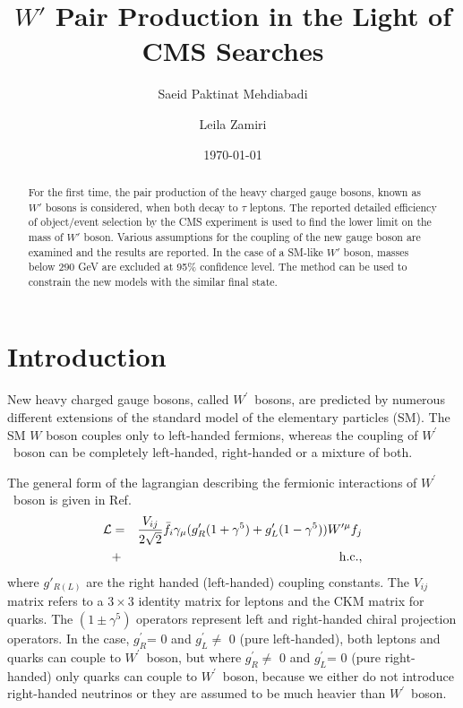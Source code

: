 \documentclass[preprint,showpacs,preprintnumbers]{revtex4}
\newcommand{\wprime}{\ensuremath{W^\prime}~}
\newcommand{\gR}{\ensuremath{g^\prime_R}}
\newcommand{\gL}{\ensuremath{g^\prime_L}}
\begin{document}
\title{$W'$ Pair Production in the Light of CMS Searches}



\author{Saeid Paktinat Mehdiabadi}

\author{Leila Zamiri}

\date{\today}

\begin{abstract}
For the first time, the pair production of the heavy charged gauge bosons, known as $W'$ bosons is considered, when both decay to $\tau$ leptons. The reported detailed efficiency of object/event selection by the CMS experiment is used to find the lower limit on the mass of $W'$ boson. Various assumptions for the coupling of the new gauge boson are examined and the results are reported. In the case of a SM-like $W'$ boson, masses below 290 GeV are excluded at 95\% confidence level. The method can be used to constrain the new models with the similar final state.
\end{abstract}

\maketitle

\section{Introduction}\label{sec:int} 
New heavy charged gauge bosons, called \wprime bosons, are predicted by numerous different extensions of the standard model of the elementary particles (SM). 
The SM $W$ boson couples only to left-handed fermions, whereas the coupling of \wprime boson can be completely left-handed, right-handed or a mixture of both. 

The general form of the lagrangian describing the fermionic interactions of \wprime boson is given in  Ref.~\cite{Sullivan:2002jt}
\begin{eqnarray}
{\cal L}& =& \frac{V_{ij}}{2\sqrt{2}}\bar{f_i} \gamma_{\mu}(g^\prime_{R} (1+{\gamma}^5)+
g^\prime_{L}
(1-{\gamma}^5)) W^{\prime \mu} f_j  \nonumber\\
&+& \mathrm{h.c.},
\label{eq:lagrangian}
\end{eqnarray}
where $g'_{R(L)}$ are the right handed (left-handed) coupling constants. The $V_{ij}$ matrix refers to a $3\times3$ identity matrix for leptons and the CKM matrix for quarks. The $(1\pm{\gamma^5})$ operators represent left and right-handed chiral projection operators. In the case, \gR = 0 and \gL $\neq$ 0 (pure left-handed), both leptons and quarks can couple to \wprime boson, but where \gR $\neq$ 0 and \gL = 0 (pure right-handed) only quarks can couple to \wprime boson, because we either do not introduce right-handed neutrinos or they are assumed to be much heavier than \wprime boson. 
\end{document}
